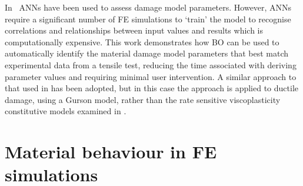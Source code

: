 \documentclass[preprint, review, 12pt]{elsarticle}
\begin{document}
	In~\cite{ABENDROTH2006, ABBASSI2013, CHAHBOUB2019, CHEN2021} ANNs have been used to assess damage model parameters.
	However, ANNs require a significant number of FE simulations to `train' the model to recognise correlations and relationships between input values and results which is computationally expensive.
	This work demonstrates how BO can be used to automatically identify the material damage model parameters that best match experimental data from a tensile test, reducing the time associated with deriving parameter values and requiring minimal user intervention.
	A similar approach to that used in \citet{RYAN2022} has been adopted, but in this case the approach is applied to ductile damage, using a Gurson model, rather than the rate sensitive viscoplasticity constitutive models examined in \citet{RYAN2022}.

	\section{Material behaviour in FE simulations}
	\label{h:general_material_behaviour}
\end{document}
